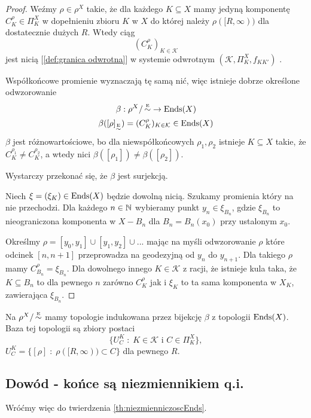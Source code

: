 \begin{proof}
  Weźmy $\rho\in\rho^X$ takie, że dla każdego $K\subseteq X$ mamy jedyną komponentę $C_K^\rho\in\Pi_K^X$ w dopełnieniu zbioru $K$ w $X$ do której należy $\rho([R,\infty))$ dla dostatecznie dużych $R$. Wtedy ciąg 
  $$(C_K^\rho)_{K\in\mathcal{K}}$$ 
  jest nicią [\ref{def:granica odwrotna}] w systemie odwrotnym $(\mathcal{K},\Pi^X_K,f_{KK'})$ . 

  Współkońcowe promienie wyznaczają tę samą nić, więc istnieje dobrze określone odwzorowanie 
  $$\beta:\rho^X/\operatorname{\overset{{\scriptscriptstyle E}}{\sim}} \to \operatorname{Ends}(X)$$
  $$\beta([\rho]_{\operatorname{\overset{{\scriptscriptstyle E}}{\sim}}})=(C_K^{\rho})_{K\in\mathcal{K}}\in \operatorname{Ends}(X)$$
  $\beta$ jest różnowartościowe, bo dla niewspółkońcowych $\rho_1,\rho_2$ istnieje $K\subseteq X$ takie, że $C_K^{\rho_1}\neq C_K^{\rho_2}$, a wtedy nici $\beta([\rho_1])\neq \beta([\rho_2])$.

  Wystarczy przekonać się, że $\beta$ jest surjekcją. 

  Niech $\xi=(\xi_K)\in\operatorname{Ends}(X)$ będzie dowolną nicią. Szukamy promienia który na nie przechodzi. Dla każdego $n\in\mathbb{N}$ wybieramy punkt $y_n\in \xi_{B_n}$, gdzie $\xi_{B_n}$ to nieograniczona komponenta w $X-B_n$ dla $B_n=B_n(x_0)$ przy ustalonym $x_0$. 

  Określmy $\rho=[y_0,y_1]\cup[y_1,y_2]\cup...$ mając na myśli odwzorowanie $\rho$ które odcinek $[n, n+1]$ przeprowadza na geodezyjną od $y_n$ do $y_{n+1}$. Dla takiego $\rho$ mamy $C_{B_n}^\rho=\xi_{B_n}$. Dla dowolnego innego $K\in \mathcal{K}$ z racji, że istnieje kula taka, że $K\subseteq B_n$ to dla pewnego $n$ zarówno $C_K^\rho$ jak i $\xi_K$ to ta sama komponenta w $X_K$, zawierająca $\xi_{B_n}$.
\end{proof}

Na $\rho^X/\operatorname{\overset{{\scriptscriptstyle E}}{\sim}}$ mamy topologie indukowana przez bijekcję $\beta$ z topologii $\operatorname{Ends}(X)$. Baza tej topologii są zbiory postaci 
$$\{U_C^K\;:\;K\in\mathcal{K}\text{ i }C\in\Pi_K^X\},$$ 
$U_C^K=\{[\rho]\;:\;\rho([R, \infty))\subset C\}$ dla pewnego $R$.


\subsection{Dowód - końce są niezmiennikiem q.i.}

Wróćmy więc do twierdzenia \ref{th:niezmienniczoscEnds}.

